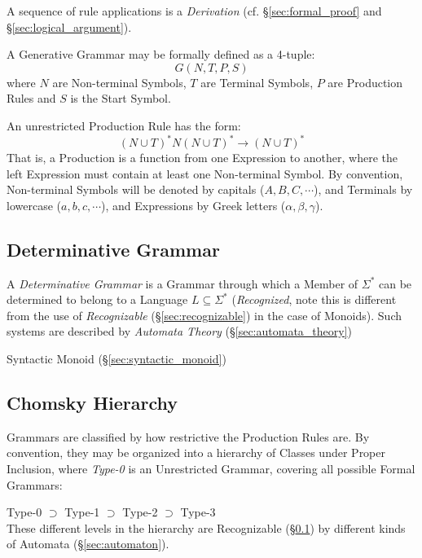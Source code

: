 A sequence of rule applications is a \emph{Derivation} (cf.
\S\ref{sec:formal_proof} and \S\ref{sec:logical_argument}).

A Generative Grammar may be formally defined as a 4-tuple:
\[
  G(N,T,P,S)
\]
where $N$ are Non-terminal Symbols, $T$ are Terminal Symbols, $P$ are
Production Rules and $S$ is the Start Symbol.

An unrestricted Production Rule has the form:
\[
  (N \cup T)^*N(N \cup T)^* \rightarrow (N \cup T)^*
\]
That is, a Production is a function from one Expression to
another, where the left Expression must contain at least one
Non-terminal Symbol. By convention, Non-terminal Symbols
will be denoted by capitals ($A,B,C,\cdots$), and Terminals by
lowercase ($a,b,c,\cdots$), and Expressions by Greek letters
($\alpha,\beta,\gamma$).



\subsection{Determinative Grammar}\label{sec:determinative_grammar}

A \emph{Determinative Grammar} is a Grammar through which a Member of
$\Sigma^*$ can be determined to belong to a Language $L \subseteq
\Sigma^*$ (\emph{Recognized}, note this is different from the use of
\emph{Recognizable} (\S\ref{sec:recognizable}) in the case of
Monoids). Such systems are described by \emph{Automata Theory}
(\S\ref{sec:automata_theory})

Syntactic Monoid (\S\ref{sec:syntactic_monoid})



\subsection{Chomsky Hierarchy}\label{sec:chomsky_hierarchy}
\cite{chomsky56}

Grammars are classified by how restrictive the Production Rules are.
By convention, they may be organized into a hierarchy of Classes under
Proper Inclusion, where \emph{Type-0} is an Unrestricted Grammar,
covering all possible Formal Grammars:

  Type-0 $\supset$ Type-1 $\supset$ Type-2 $\supset$ Type-3 \\
These different levels in the hierarchy are Recognizable
(\S\ref{sec:determinative_grammar}) by different kinds of Automata
(\S\ref{sec:automaton}).

